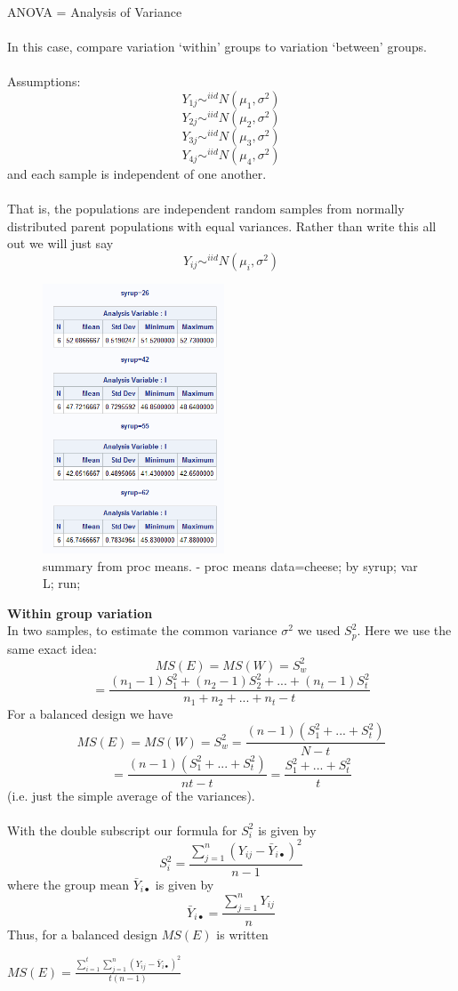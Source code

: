 \newpage

\Large ANOVA = Analysis of Variance\normalsize\\~\\
In this case, compare variation `within' groups to variation `between' groups.\\~\\
Assumptions: 
$$Y_{1j}\sim^{iid}N(\mu_1,\sigma^2)$$
$$Y_{2j}\sim^{iid}N(\mu_2,\sigma^2)$$
$$Y_{3j}\sim^{iid}N(\mu_3,\sigma^2)$$
$$Y_{4j}\sim^{iid}N(\mu_4,\sigma^2)$$
and each sample is independent of one another.  \\~\\
That is, the populations are independent random samples from normally distributed parent populations with equal variances.  Rather than write this all out we will just say
$$Y_{ij}\sim^{iid}N(\mu_i,\sigma^2)$$

\begin{figure}
  \begin{center}
    \includegraphics[width=0.48\textwidth]{colorsummary}
  \end{center}
  \caption{summary from proc means. - 
	proc means data=cheese;
  by syrup; var L; run;}
\end{figure}

\large \textbf{Within group variation} \normalsize\\
In two samples, to estimate the common variance $\sigma^2$ we used $S_p^2$.  Here we use the same exact idea:
$$MS(E) = MS(W) = S^2_w $$
$$=\frac{(n_1-1)S^2_1+(n_2-1)S^2_2+...+(n_t-1)S^2_t}{n_1+n_2+...+n_t-t}$$
For a balanced design we have
$$MS(E) = MS(W) = S^2_w = \frac{(n-1)(S^2_1+...+S^2_t)}{N-t} $$
$$= \frac{(n-1)(S^2_1+...+S^2_t)}{nt-t}=\frac{S^2_1+...+S^2_t}{t}$$
(i.e. just the simple average of the variances).\\~\\
With the double subscript our formula for $S^2_i$ is given by 
$$S^2_i = \frac{\sum_{j=1}^{n}(Y_{ij}-\bar{Y}_{i\bullet})^2}{n-1}$$
where the group mean $\bar{Y}_{i\bullet}$ is given by
$$\bar{Y}_{i\bullet} = \frac{\sum_{j=1}^{n}Y_{ij}}{n}$$
Thus, for a balanced design $MS(E)$ is written 
\begin{flushleft}
$MS(E)=\frac{\sum_{i=1}^{t}\sum_{j=1}^{n}(Y_{ij}-\bar{Y}_{i\bullet})^2}{t(n-1)}$
\end{flushleft}

